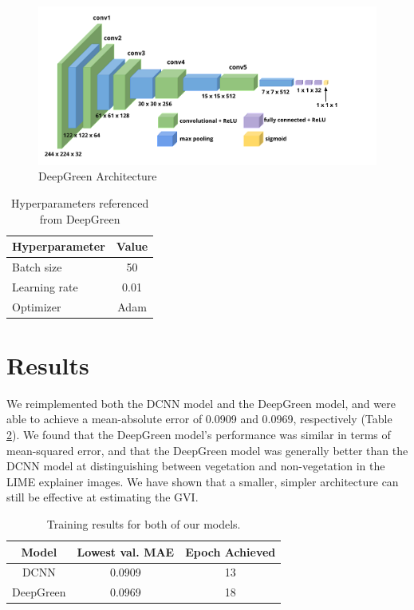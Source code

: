 \begin{figure}[t]
    \centering
    \includegraphics[width=\linewidth]{Deepgreen.png}
    \caption{DeepGreen Architecture}
    \label{fig:dgreenmodel}
\end{figure}

\begin{table}
\begin{center}
\begin{tabular}{ l c }
\toprule
Hyperparameter & Value \\
\midrule
Batch size & 50 \\
Learning rate & 0.01 \\
Optimizer & Adam\\
\bottomrule
\end{tabular}
\end{center}
\caption{Hyperparameters referenced from DeepGreen}
\label{tab:dgreentable}
\end{table}


\section{Results}

We reimplemented both the DCNN model  and the DeepGreen model, and were able to achieve a mean-absolute error of 0.0909 and 0.0969, respectively (Table \ref{tab:result1}). We found that the DeepGreen model’s performance was similar in terms of mean-squared error, and that the DeepGreen model was generally better than the DCNN model at distinguishing between vegetation and non-vegetation in the LIME explainer images. We have shown that a smaller, simpler architecture can still be effective at estimating the GVI. 

\begin{table}
\begin{center}
\begin{tabular}{c|c|c}
\toprule
Model & Lowest val. MAE & Epoch Achieved \\
\midrule
DCNN & 0.0909 & 13 \\
DeepGreen & 0.0969 & 18 \\
\bottomrule
\end{tabular}
\end{center}
\caption{Training results for both of our models.}
\label{tab:result1}
\end{table}

